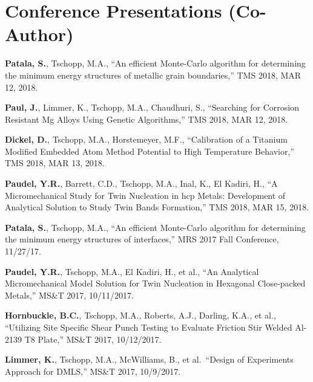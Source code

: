 \section{\sc Conference Presentations (Co-Author)}

\begin{cvlist}
\setlength{\itemsep}{0in}
\setlength{\parsep}{0in} 
\setlength{\parskip}{0in}
\setlength{\topsep}{0in} 
\setlength{\partopsep}{0in} 
\setlength{\leftmargin}{0.2in}

\item
\textbf{Patala, S.}, {Tschopp, M.A.}, ``An efficient Monte-Carlo algorithm for determining the minimum energy structures of metallic grain boundaries,'' TMS 2018, MAR 12, 2018.

\item
\textbf{Paul, J.}, Limmer, K., {Tschopp, M.A.}, Chaudhuri, S., ``Searching for Corrosion Resistant Mg Alloys Using Genetic Algorithms,'' TMS 2018, MAR 12, 2018.

\item
\textbf{Dickel, D.}, {Tschopp, M.A.}, Horstemeyer, M.F., ``Calibration of a Titanium Modified Embedded Atom Method Potential to High Temperature Behavior,''  TMS 2018, MAR 13, 2018.

\item
\textbf{Paudel, Y.R.}, Barrett, C.D., {Tschopp, M.A.}, Inal, K., El Kadiri, H., ``A Micromechanical Study for Twin Nucleation in hcp Metals: Development of Analytical Solution to Study Twin Bands Formation,''  TMS 2018, MAR 15, 2018.

\item
\textbf{Patala, S.}, {Tschopp, M.A.}, ``An efficient Monte-Carlo algorithm for determining the minimum energy structures of interfaces,'' MRS 2017 Fall Conference, 11/27/17.

\item
\textbf{Paudel, Y.R.}, {Tschopp, M.A.}, El Kadiri, H., et al., ``An Analytical Micromechanical Model Solution for Twin Nucleation in Hexagonal Close-packed Metals,'' MS\&T 2017, 10/11/2017.

\item
\textbf{Hornbuckle, B.C.}, {Tschopp, M.A.}, Roberts, A.J., Darling, K.A., et al., ``Utilizing Site Specific Shear Punch Testing to Evaluate Friction Stir Welded Al-2139 T8 Plate,'' MS\&T 2017, 10/12/2017.

\item
\textbf{Limmer, K.}, {Tschopp, M.A.}, McWilliams, B., et al.~``Design of Experiments Approach for DMLS,'' MS\&T 2017, 10/9/2017.


\end{cvlist}
